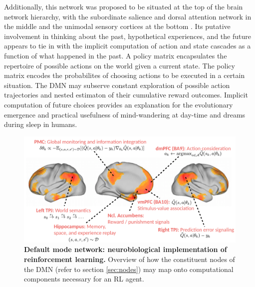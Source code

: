 \documentclass[10pt,letterpaper]{article}
\begin{document}
Additionally,
this network was proposed to be situated
at the top of the brain network hierarchy, with
the subordinate salience and dorsal attention network in the middle and
the unimodal sensory cortices at the bottom
\citep{carhart2010default, margulies2016situating}.
Its putative involvement in thinking about the past,
hypothetical experiences, and the future
appears to tie in with the implicit computation of
action and state cascades as a function of what happened in the past.
A policy matrix encapsulates the repertoire of possible actions
on the world given a current state.
The policy matrix encodes the probabilites of
choosing actions to be executed in a certain situation.
The DMN may subserve
  constant exploration of possible action trajectories and
  nested estimaton of their
  cumulative reward outcomes. Implicit computation of future choices
  provides an explanation for the
  evolutionary emergence and practical usefulness of
  mind-wandering at day-time and dreams during sleep
  in humans.
\begin{figure}[!h]
  \includegraphics[width=.9\linewidth]{neurobiological_and_rl_overview_DMN.pdf}
  \caption{\textbf{Default mode network:
  neurobiological implementation of reinforcement learning.}
  Overview of how the constituent nodes of the DMN (refer to section \ref{sec:nodes}) may
  map onto computational components necessary for an RL agent.}
  \label{fig:rl_process_chart}
\end{figure}
\end{document}
